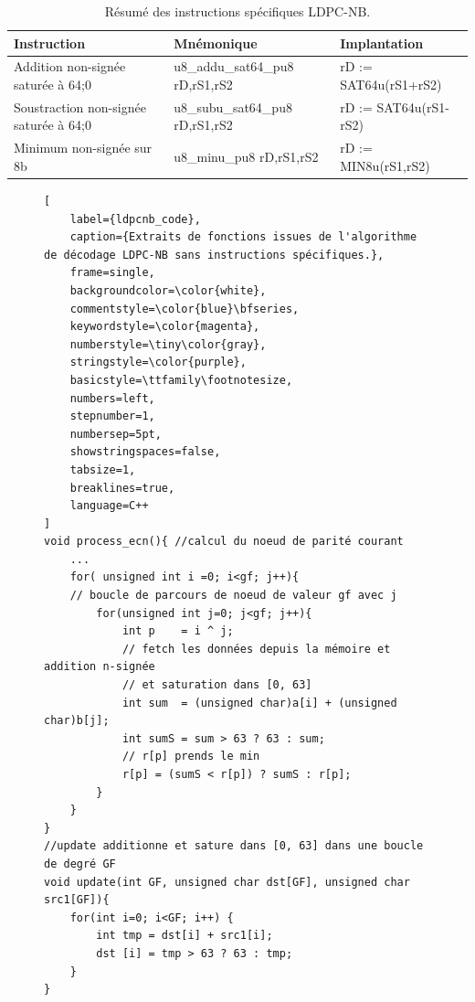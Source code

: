 \documentclass[../main.tex]{subfiles}
\begin{document}
\begin{table}[!tb]
    \footnotesize
    \centering
\begin{tabular}{ l || l l }
\hline
\textbf{Instruction}                    & \textbf{Mnémonique}       & \textbf{Implantation} \\
\hline
Addition non-signée saturée à 64;0      & u8\_addu\_sat64\_pu8  rD,rS1,rS2 & rD := SAT64u(rS1+rS2) \\ 
Soustraction non-signée saturée à 64;0  & u8\_subu\_sat64\_pu8  rD,rS1,rS2 & rD := SAT64u(rS1-rS2)  \\ 
Minimum non-signée sur 8b               & u8\_minu\_pu8         rD,rS1,rS2 & rD := MIN8u(rS1,rS2)  \\
\hline
\end{tabular}    
\caption{Résumé des instructions spécifiques LDPC-NB.}
\label{ldpcnb_instr}
\end{table}

\begin{figure}[!tb]
\begin{lstlisting}[
    label={ldpcnb_code},
    caption={Extraits de fonctions issues de l'algorithme de décodage LDPC-NB sans instructions spécifiques.},
    frame=single,
    backgroundcolor=\color{white},  
    commentstyle=\color{blue}\bfseries,
    keywordstyle=\color{magenta},
    numberstyle=\tiny\color{gray},
    stringstyle=\color{purple},
    basicstyle=\ttfamily\footnotesize,
    numbers=left,
    stepnumber=1,
    numbersep=5pt,                 
    showstringspaces=false,
    tabsize=1,
    breaklines=true,
    language=C++
]
void process_ecn(){ //calcul du noeud de parité courant 
    ...
    for( unsigned int i =0; i<gf; j++){
    // boucle de parcours de noeud de valeur gf avec j 
        for(unsigned int j=0; j<gf; j++){
            int p    = i ^ j; 
            // fetch les données depuis la mémoire et addition n-signée
            // et saturation dans [0, 63] 
            int sum  = (unsigned char)a[i] + (unsigned char)b[j];
            int sumS = sum > 63 ? 63 : sum;
            // r[p] prends le min
            r[p] = (sumS < r[p]) ? sumS : r[p];
        }
    }
}
//update additionne et sature dans [0, 63] dans une boucle de degré GF 
void update(int GF, unsigned char dst[GF], unsigned char src1[GF]){
    for(int i=0; i<GF; i++) {
        int tmp = dst[i] + src1[i];
        dst [i] = tmp > 63 ? 63 : tmp;
    }
}
\end{lstlisting}
\end{figure}
\end{document}
